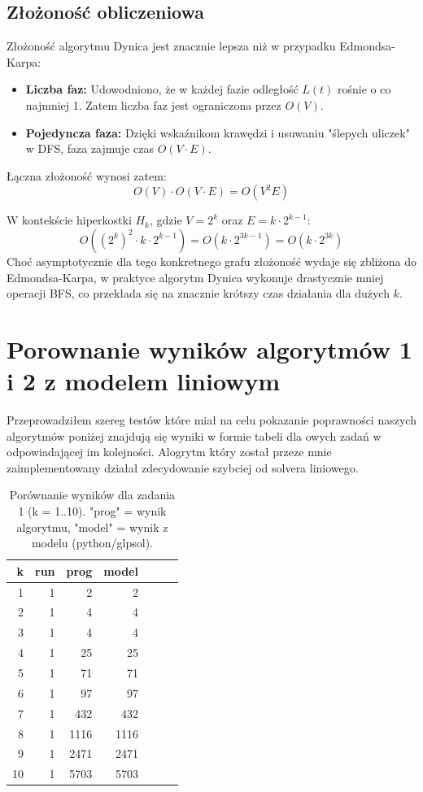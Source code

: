 \documentclass[11pt, a4paper]{article}
\begin{document}
	
	
	\subsection{Złożoność obliczeniowa}
	Złożoność algorytmu Dynica jest znacznie lepsza niż w przypadku Edmondsa-Karpa:
	
	\begin{itemize}
		\item \textbf{Liczba faz:} Udowodniono, że w każdej fazie odległość $L(t)$ rośnie o co najmniej 1. Zatem liczba faz jest ograniczona przez $O(V)$.
		\item \textbf{Pojedyncza faza:} Dzięki wskaźnikom krawędzi i usuwaniu "ślepych uliczek" w DFS, faza zajmuje czas $O(V \cdot E)$.
	\end{itemize}
	
	Łączna złożoność wynosi zatem:
	\begin{equation}
		O(V) \cdot O(V \cdot E) = O(V^2 E)
	\end{equation}
	
	W kontekście hiperkostki $H_k$, gdzie $V = 2^k$ oraz $E = k \cdot 2^{k-1}$:
	\begin{equation}
		O((2^k)^2 \cdot k \cdot 2^{k-1}) = O(k \cdot 2^{3k-1}) = O(k \cdot 2^{3k})
	\end{equation}
	Choć asymptotycznie dla tego konkretnego grafu złożoność wydaje się zbliżona do Edmondsa-Karpa, w praktyce algorytm Dynica wykonuje drastycznie mniej operacji BFS, co przekłada się na znacznie krótszy czas działania dla dużych $k$.
	
	\section{Porownanie wyników algorytmów 1 i 2 z modelem liniowym}
	Przeprowadziłem szereg testów które miał na celu pokazanie poprawności naszych algorytmów poniżej znajdują się wyniki w formie tabeli dla owych zadań w odpowiadającej im kolejności.
	Alogrytm który został przeze mnie zaimplementowany działał zdecydowanie szybciej od solvera liniowego.
	
	\begin{table}[ht]
		\centering
		\caption{Porównanie wyników dla zadania 1 (k = 1..10). "prog" = wynik algorytmu, "model" = wynik z modelu (python/glpsol).}
		\label{tab:task1-comparison}
		\begin{tabular}{r r r r c r r}
			\toprule
			k & run & prog & model\\
			\midrule
			1 & 1 & 2 & 2 \\
			2 & 1 & 4 & 4\\
			3 & 1 & 4 & 4\\
			4 & 1 & 25 & 25  \\
			5 & 1 & 71 & 71 \\
			6 & 1 & 97 & 97\\
			7 & 1 & 432 & 432 \\
			8 & 1 & 1116 & 1116 \\
			9 & 1 & 2471 & 2471 \\
			10 & 1 & 5703 & 5703 \\
			\bottomrule
		\end{tabular}
	\end{table}
	
\end{document}
